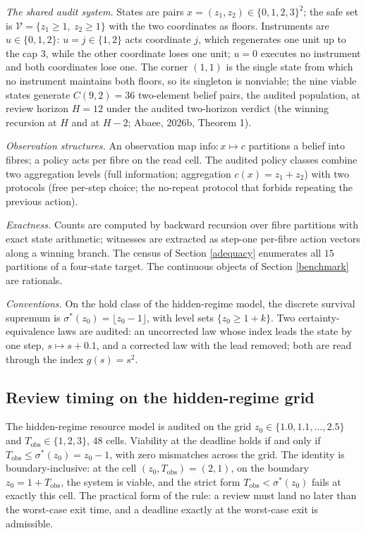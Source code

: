 \documentclass[10pt,twocolumn]{article}
\theoremstyle{definition}
\begin{document}
\emph{The shared audit system.} States are pairs
\(x = (z_1, z_2) \in \{0,1,2,3\}^{2}\); the safe set is
\(\mathcal{V} = \{z_1 \ge 1,\ z_2 \ge 1\}\) with the two coordinates as
floors. Instruments are \(u \in \{0, 1, 2\}\): \(u = j \in \{1,2\}\)
acts coordinate \(j\), which regenerates one unit up to the cap \(3\),
while the other coordinate loses one unit; \(u = 0\) executes no
instrument and both coordinates lose one. The corner \((1,1)\) is the
single state from which no instrument maintains both floors, so its
singleton is nonviable; the nine viable states generate
\(C(9,2) = 36\) two-element belief pairs, the audited population, at
review horizon \(H = 12\) under the audited two-horizon verdict (the
winning recursion at \(H\) and at \(H - 2\); Abaee, 2026b, Theorem 1).

\emph{Observation structures.} An observation map
\(\mathrm{info}: x \mapsto c\) partitions a belief into fibres; a policy
acts per fibre on the read cell. The audited policy classes combine two
aggregation levels (full information; aggregation
\(c(x) = z_1 + z_2\)) with two protocols (free per-step choice; the
no-repeat protocol that forbids repeating the previous action).

\emph{Exactness.} Counts are computed by backward recursion over fibre
partitions with exact state arithmetic; witnesses are extracted as
step-one per-fibre action vectors along a winning branch. The census of
Section \ref{adequacy} enumerates all \(15\) partitions of a four-state
target. The continuous objects of Section \ref{benchmark} are rationals.

\emph{Conventions.} On the hold class of the hidden-regime model, the
discrete survival supremum is \(\sigma^{*}(z_0) = \lfloor z_0 - 1
\rfloor\), with level sets \(\{z_0 \ge 1 + k\}\). Two
certainty-equivalence laws are audited: an uncorrected law whose index
leads the state by one step, \(s \mapsto s + 0.1\), and a corrected law
with the lead removed; both are read through the index \(g(s) = s^{2}\).

\subsection{Review timing on the hidden-regime grid}\label{timing}

The hidden-regime resource model is audited on the grid
\(z_0 \in \{1.0, 1.1, \dots, 2.5\}\) and
\(T_{\mathrm{obs}} \in \{1, 2, 3\}\), 48 cells. Viability at the
deadline holds if and only if
\(T_{\mathrm{obs}} \le \sigma^{*}(z_0) = z_0 - 1\), with zero
mismatches across the grid. The identity is boundary-inclusive: at the
cell \((z_0, T_{\mathrm{obs}}) = (2, 1)\), on the boundary
\(z_0 = 1 + T_{\mathrm{obs}}\), the system is viable, and the strict
form \(T_{\mathrm{obs}} < \sigma^{*}(z_0)\) fails at exactly this cell.
The practical form of the rule: a review must land no later than the
worst-case exit time, and a deadline exactly at the worst-case exit is
admissible.
\end{document}
